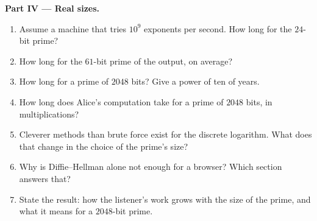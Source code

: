 \begin{problem}
\medskip\noindent\textbf{Part IV --- Real sizes.}
\begin{enumerate}[resume]
  \item Assume a machine that tries $10^9$ exponents per second. How long for the $24$-bit prime?
  \item How long for the $61$-bit prime of the output, on average?
  \item How long for a prime of $2048$ bits? Give a power of ten of years.
  \item How long does Alice's computation take for a prime of $2048$ bits, in multiplications?
  \item Cleverer methods than brute force exist for the discrete logarithm. What does that change in the choice of
    the prime's size?
  \item Why is Diffie--Hellman alone not enough for a browser? Which section answers that?
  \item State the result: how the listener's work grows with the size of the prime, and what it means for a
    $2048$-bit prime.
\end{enumerate}
\end{problem}
